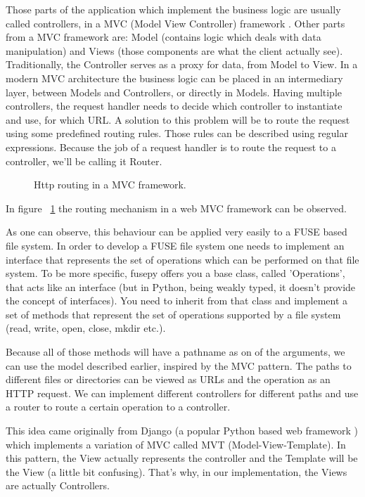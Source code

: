Those parts of the application which implement the business logic are usually called controllers, in a MVC (Model View Controller) framework \cite{Deacon2009}. Other parts from a MVC framework are: Model (contains logic which deals with data manipulation) and Views (those components are what the client actually see). Traditionally, the Controller serves as a proxy for data, from Model to View. In a modern MVC architecture the business logic can be placed in an intermediary layer, between Models and Controllers, or directly in Models. Having multiple controllers, the request handler needs to decide which controller to instantiate and use, for which URL. A solution to this problem will be to route the request using some predefined routing rules. Those rules can be described using regular expressions. Because the job of a request handler is to route the request to a controller, we'll be calling it Router.

\begin{figure}[h]
  \begin{center}
    \def\svgwidth{\columnwidth}
    
    \caption{Http routing in a MVC framework.}
    \label{fig:mvc}
  \end{center}
\end{figure}

In figure ~\ref{fig:mvc} the routing mechanism in a web MVC framework can be observed.

As one can observe, this behaviour can be applied very easily to a FUSE based file system. In order to develop a FUSE file system one needs to implement an interface that represents the set of operations which can be performed on that file system. To be more specific, fusepy offers you a base class, called 'Operations', that acts like an interface (but in Python, being weakly typed, it doesn't provide the concept of interfaces). You need to inherit from that class and implement a set of methods that represent the set of operations supported by a file system (read, write, open, close, mkdir etc.).

Because all of those methods will have a pathname as on of the arguments, we can use the model described earlier, inspired by the MVC pattern. The paths to different files or directories can be viewed as URLs and the operation as an HTTP request. We can implement different controllers for different paths and use a router to route a certain operation to a controller.

This idea came originally from Django (a popular Python based web framework \cite{Django}) which implements a variation of MVC called MVT (Model-View-Template). In this pattern, the View actually represents the controller and the Template will be the View (a little bit confusing). That's why, in our implementation, the Views are actually Controllers.

